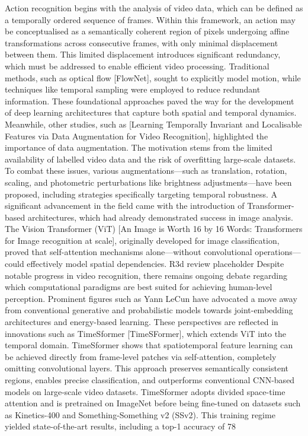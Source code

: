 \documentclass[conference]{IEEEtran}
\begin{document}
Action recognition begins with the analysis of video data, which can be defined as a temporally ordered sequence of frames. Within this framework, an action may be conceptualised as a semantically coherent region of pixels undergoing affine transformations across consecutive frames, with only minimal displacement between them. This limited displacement introduces significant redundancy, which must be addressed to enable efficient video processing.
Traditional methods, such as optical flow [FlowNet], sought to explicitly model motion, while techniques like temporal sampling were employed to reduce redundant information. These foundational approaches paved the way for the development of deep learning architectures that capture both spatial and temporal dynamics.
Meanwhile, other studies, such as [Learning Temporally Invariant and Localisable Features via Data Augmentation for Video Recognition], highlighted the importance of data augmentation. The motivation stems from the limited availability of labelled video data and the risk of overfitting large-scale datasets. To combat these issues, various augmentations—such as translation, rotation, scaling, and photometric perturbations like brightness adjustments—have been proposed, including strategies specifically targeting temporal robustness.
A significant advancement in the field came with the introduction of Transformer-based architectures, which had already demonstrated success in image analysis. The Vision Transformer (ViT) [An Image is Worth 16 by 16 Words: Transformers for Image recognition at scale], originally developed for image classification, proved that self-attention mechanisms alone—without convolutional operations—could effectively model spatial dependencies.
R3d review placeholder 
Despite notable progress in video recognition, there remains ongoing debate regarding which computational paradigms are best suited for achieving human-level perception. Prominent figures such as Yann LeCun have advocated a move away from conventional generative and probabilistic models towards joint-embedding architectures and energy-based learning. These perspectives are reflected in innovations such as TimeSformer [TimeSFormer], which extends ViT into the temporal domain. TimeSformer shows that spatiotemporal feature learning can be achieved directly from frame-level patches via self-attention, completely omitting convolutional layers. This approach preserves semantically consistent regions, enables precise classification, and outperforms conventional CNN-based models on large-scale video datasets.
TimeSformer adopts divided space-time attention and is pretrained on ImageNet before being fine-tuned on datasets such as Kinetics-400 and Something-Something v2 (SSv2). This training regime yielded state-of-the-art results, including a top-1 accuracy of 78%
\end{document}
